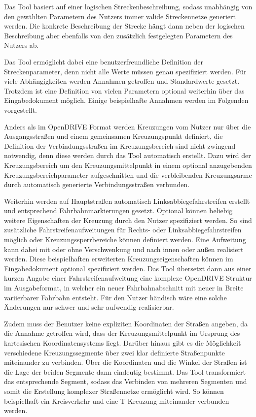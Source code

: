 Das Tool basiert auf einer logischen Streckenbeschreibung, sodass unabhängig von den gewählten Parametern des Nutzers immer valide Streckennetze generiert werden. Die konkrete Beschreibung der Strecke hängt dann neben der logischen Beschreibung aber ebenfalls von den zusätzlich festgelegten Parametern des Nutzers ab.

Das Tool ermöglicht dabei eine benutzerfreundliche Definition der Streckenparameter, denn nicht alle Werte müssen genau spezifiziert werden. Für viele Abhängigkeiten werden Annahmen getroffen und Standardwerte gesetzt. Trotzdem ist eine Definition von vielen Parametern optional weiterhin über das Eingabedokument möglich. Einige beispielhafte Annahmen werden im Folgenden vorgestellt.

Anders als im OpenDRIVE Format werden Kreuzungen vom Nutzer nur über die Ausgangsstraßen und einem gemeinsamen Kreuzungspunkt definiert, die Definition der Verbindungsstraßen im Kreuzungsbereich sind nicht zwingend notwendig, denn diese werden durch das Tool automatisch erstellt. Dazu wird der Kreuzungsbereich um den Kreuzungsmittelpunkt in einem optional anzugebenden Kreuzungsbereichparameter aufgeschnitten und die verbleibenden Kreuzungsarme durch automatisch generierte Verbindungsstraßen verbunden.

Weiterhin werden auf Hauptstraßen automatisch Linksabbiegefahrstreifen erstellt und entsprechend Fahrbahnmarkierungen gesetzt. Optional können beliebig weitere Eigenschaften der Kreuzung durch den Nutzer spezifiziert werden. So sind zusätzliche Fahrstreifenaufweitungen für Rechts- oder Linksabbiegefahrstreifen möglich oder Kreuzungssperrbereiche können definiert werden. Eine Aufweitung kann dabei mit oder ohne Verschwenkung und nach innen oder außen realisiert werden. Diese beispielhaften erweiterten Kreuzungseigenschaften können im Eingabedokument optional spezifiziert werden. Das Tool übersetzt dann aus einer kurzen Angabe einer Fahrstreifenaufweitung eine komplexe OpenDRIVE Struktur im Ausgabeformat, in welcher ein neuer Fahrbahnabschnitt mit neuer in Breite variierbarer Fahrbahn entsteht. Für den Nutzer händisch wäre eine solche Änderungen nur schwer und sehr aufwendig realisierbar.

Zudem muss der Benutzer keine expliziten Koordinaten der Straßen angeben, da die Annahme getroffen wird, dass der Kreuzungsmittelpunkt im Ursprung des kartesischen Koordinatensystems liegt. Darüber hinaus gibt es die Möglichkeit verschiedene Kreuzungssegmente über zwei klar definierte Straßenpunkte miteinander zu verbinden. Über die Koordinaten und die Winkel der Straßen ist die Lage der beiden Segmente dann eindeutig bestimmt. Das Tool transformiert das entsprechende Segment, sodass das Verbinden von mehreren Segmenten und somit die Erstellung komplexer Straßennetze ermöglicht wird. So können beispielhaft ein Kreisverkehr und eine T-Kreuzung miteinander verbunden werden.

